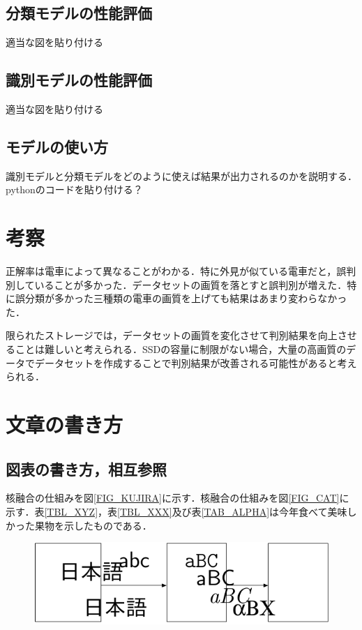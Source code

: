 \begin{multicols*}{2}
\subsection{分類モデルの性能評価}
適当な図を貼り付ける
\subsection{識別モデルの性能評価}
適当な図を貼り付ける

\subsection{モデルの使い方}
識別モデルと分類モデルをどのように使えば結果が出力されるのかを説明する．pythonのコードを貼り付ける？

\section{考察}
正解率は電車によって異なることがわかる．特に外見が似ている電車だと，誤判別していることが多かった．データセットの画質を落とすと誤判別が増えた．特に誤分類が多かった三種類の電車の画質を上げても結果はあまり変わらなかった．

限られたストレージでは，データセットの画質を変化させて判別結果を向上させることは難しいと考えられる．SSDの容量に制限がない場合，大量の高画質のデータでデータセットを作成することで判別結果が改善される可能性があると考えられる．



\section{文章の書き方}
\subsection{図表の書き方，相互参照}
核融合の仕組みを図\ref{FIG_KUJIRA}に示す\cite{jp2k1,bk1}．核融合の仕組みを図\ref{FIG_CAT}に示す．表\ref{TBL_XYZ}，表\ref{TBL_XXX}及び表\ref{TAB_ALPHA}は今年食べて美味しかった果物を示したものである\cite{sdkguide}．

\begin{figure} %
	\centering
	\includegraphics[width=\linewidth]{fig/concept.pdf}
\end{figure}


\end{multicols*}
